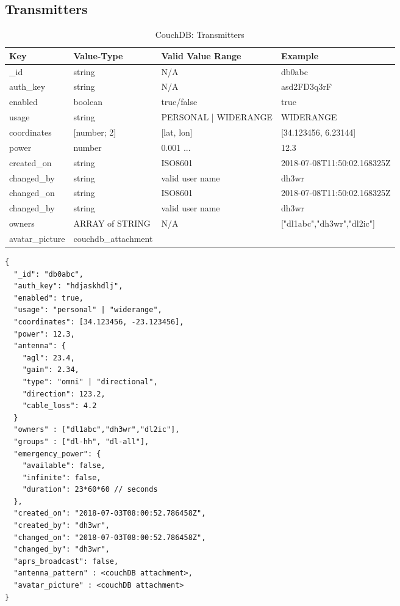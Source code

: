 \subsection{Transmitters}
\begin{table}[h]
 \caption{CouchDB: Transmitters}
 \begin{tabular}{|l|l|l|l|}\hline
  Key & Value-Type & Valid Value Range & Example \\
  \hline
  \_id & string & N/A & db0abc \\
  auth\_key & string & N/A & asd2FD3q3rF \\
  enabled & boolean & true/false & true \\
  usage & string & PERSONAL | WIDERANGE & WIDERANGE \\
  coordinates & [number; 2]  & [lat, lon] & [34.123456, 6.23144] \\
  power & number & 0.001 ...  & 12.3 \\
  created\_on & string & ISO8601 & 2018-07-08T11:50:02.168325Z \\
  changed\_by & string & valid user name & dh3wr \\
  changed\_on & string & ISO8601 & 2018-07-08T11:50:02.168325Z \\
  changed\_by & string & valid user name & dh3wr \\
  owners & ARRAY of STRING & N/A & ["dl1abc","dh3wr","dl2ic"] \\
  avatar\_picture & couchdb\_attachment & & \\ \hline
  \end{tabular}
  \label{tab:couchdb:transmitters}
\end{table}

\begin{lstlisting}
{
  "_id": "db0abc",
  "auth_key": "hdjaskhdlj",
  "enabled": true,
  "usage": "personal" | "widerange",
  "coordinates": [34.123456, -23.123456],
  "power": 12.3,
  "antenna": {
    "agl": 23.4,
    "gain": 2.34,
    "type": "omni" | "directional",
    "direction": 123.2,
    "cable_loss": 4.2
  }
  "owners" : ["dl1abc","dh3wr","dl2ic"],
  "groups" : ["dl-hh", "dl-all"],
  "emergency_power": {
    "available": false,
    "infinite": false,
    "duration": 23*60*60 // seconds
  },
  "created_on": "2018-07-03T08:00:52.786458Z",
  "created_by": "dh3wr",
  "changed_on": "2018-07-03T08:00:52.786458Z",
  "changed_by": "dh3wr",
  "aprs_broadcast": false,
  "antenna_pattern" : <couchDB attachment>,
  "avatar_picture" : <couchDB attachment>
}
\end{lstlisting}

